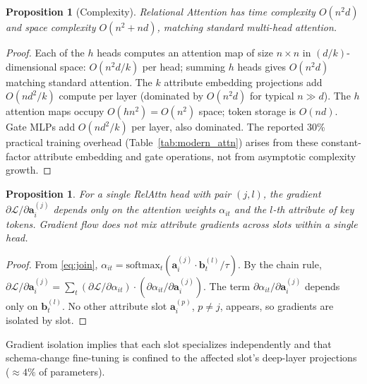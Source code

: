 \documentclass[conference]{IEEEtran}
\newtheorem{proposition}[theorem]{Proposition}
\newcommand{\softmax}{\mathrm{softmax}}
\begin{document}
\begin{proposition}[Complexity]
Relational Attention has time complexity $O(n^2 d)$ and space complexity $O(n^2 + nd)$, matching standard multi-head attention.
\end{proposition}

\begin{proof}
	\renewcommand{\qedsymbol}{}
Each of the $h$ heads computes an attention map of size $n \times n$ in $(d/k)$-dimensional space: $O(n^2 d/k)$ per head; summing $h$ heads gives $O(n^2 d)$ matching standard attention. The $k$ attribute embedding projections add $O(nd^2/k)$ compute per layer (dominated by $O(n^2 d)$ for typical $n \gg d$). The $h$ attention maps occupy $O(hn^2) = O(n^2)$ space; token storage is $O(nd)$. Gate MLPs add $O(nd^2/k)$ per layer, also dominated. The reported 30\% practical training overhead (Table~\ref{tab:modern_attn}) arises from these constant-factor attribute embedding and gate operations, not from asymptotic complexity growth.
\end{proof}

\begin{proposition}
\label{prop:gradient}
For a single RelAttn head with pair $(j,l)$, the gradient $\partial\mathcal{L}/\partial \mathbf{a}^{(j)}_i$ depends only on the attention weights $\alpha_{it}$ and the $l$-th attribute of key tokens. Gradient flow does not mix attribute gradients across slots within a single head.
\end{proposition}

\begin{proof}
	\renewcommand{\qedsymbol}{}
From \eqref{eq:join}, $\alpha_{it} = \softmax_t(\mathbf{a}_i^{(j)} \cdot \mathbf{b}_t^{(l)} / \tau)$. By the chain rule, $\partial \mathcal{L}/\partial \mathbf{a}^{(j)}_i = \sum_t (\partial \mathcal{L}/\partial \alpha_{it}) \cdot (\partial \alpha_{it}/\partial \mathbf{a}^{(j)}_i)$. The term $\partial \alpha_{it}/\partial \mathbf{a}^{(j)}_i$ depends only on $\mathbf{b}_t^{(l)}$. No other attribute slot $\mathbf{a}^{(p)}_i$, $p \neq j$, appears, so gradients are isolated by slot.
\end{proof}

Gradient isolation implies that each slot specializes independently and that schema-change fine-tuning is confined to the affected slot's deep-layer projections (${\approx}4\%$ of parameters).
\end{document}
